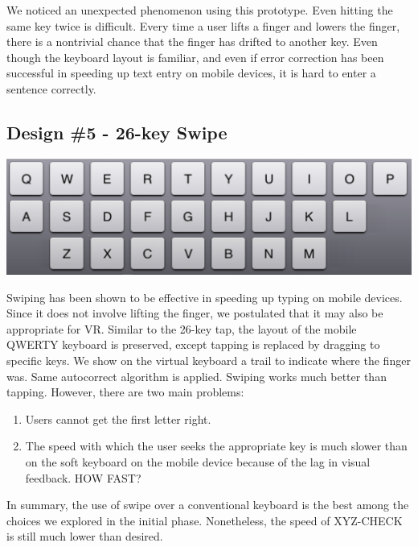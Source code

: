 We noticed an unexpected phenomenon using this prototype.  Even hitting the same key twice is difficult.  Every time a user lifts a finger and lowers the finger, there is a nontrivial chance that the finger has drifted to another key.  Even though the keyboard layout is familiar, and even if error correction has been successful in speeding up text entry on mobile devices, it is hard to enter a sentence correctly.   

\subsection{Design \#5 - 26-key Swipe}
\vspace*{.1cm}
\includegraphics[width=.9\columnwidth]{figures/26Tap}

Swiping has been shown to be effective in speeding up typing on mobile devices.  Since it does not involve lifting the finger, we postulated that it may also be appropriate for VR.  
Similar to the 26-key tap, the layout of the mobile QWERTY keyboard is preserved, except tapping is replaced by dragging to specific keys.  We show on the virtual keyboard a trail to indicate where the finger was.  Same autocorrect algorithm is applied.   Swiping works much better than tapping.  However, there are two main problems: 
\begin{enumerate}
\item
Users cannot get the first letter right. 
\item
The speed with which the user seeks the appropriate key is much slower than on the soft keyboard on the mobile device because of the lag in visual feedback. 
HOW FAST? 
\end{enumerate}

In summary, the use of swipe over a conventional keyboard is the best among the choices we explored in the initial phase.  Nonetheless, the speed of XYZ-CHECK is still much lower than desired. 


